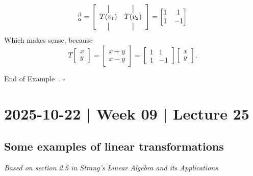 \documentclass[10pt]{article}
\theoremstyle{definition}
\newtheorem{example}[theorem]{Example}
\renewenvironment{example}
{\begin{oldexample}}
  {\par\smallskip\hfill   End of Example~\theexample. $\square$    \par\end{oldexample}}
\begin{document}
\begin{example}
  \begin{equation*}
    [T]_{\alpha}^{\beta} =
    \begin{bmatrix}
      \begin{array}{cc}
        \vertbar & \vertbar\\
        T(v_{1})    & T(v_{2})\\
        \vertbar & \vertbar \\
      \end{array}
    \end{bmatrix}
    =
    \begin{bmatrix}
      1&1\\
      1&-1
    \end{bmatrix}
  \end{equation*}
  Which makes sense, because
  \begin{equation*}
    T
    \begin{bmatrix}
      x\\y
    \end{bmatrix}
    =
    \begin{bmatrix}
      x+y\\x-y
    \end{bmatrix}
    =
    \begin{bmatrix}
      1&1\\1&-1
    \end{bmatrix}
    \begin{bmatrix}
      x\\y
    \end{bmatrix}.
  \end{equation*}
\end{example}

\newpage


\newpage
\section{2025-10-22 | Week 09 | Lecture 25}
\subsection{Some examples of linear transformations}
\textit{Based on section 2.5 in Strang's Linear Algebra and its Applications}
\end{document}
